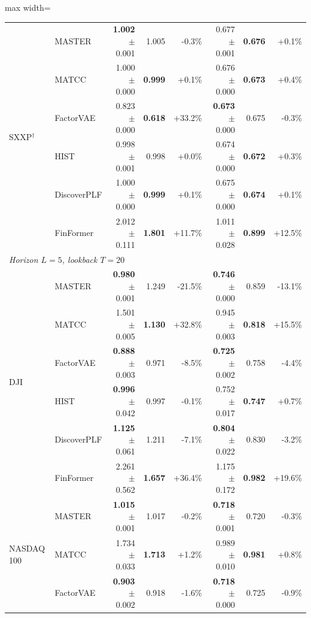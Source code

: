 \begin{table}[tb]
\begin{adjustbox}{max width=\textwidth}
{\begin{tabular}{llrrrrrr}
\midrule
\multirow{6}{*}{SXXP$^\dagger$} & MASTER & \textbf{1.002} {\scriptsize$\pm$0.001} & 1.005 & -0.3\% & 0.677 {\scriptsize$\pm$0.001} & \textbf{0.676} & +0.1\% \\
 & MATCC & 1.000 {\scriptsize$\pm$0.000} & \textbf{0.999} & +0.1\% & 0.676 {\scriptsize$\pm$0.000} & \textbf{0.673} & +0.4\% \\
 & FactorVAE & 0.823 {\scriptsize$\pm$0.000} & \textbf{0.618} & +33.2\% & \textbf{0.673} {\scriptsize$\pm$0.000} & 0.675 & -0.3\% \\
 & HIST & 0.998 {\scriptsize$\pm$0.001} & 0.998 & +0.0\% & 0.674 {\scriptsize$\pm$0.000} & \textbf{0.672} & +0.3\% \\
 & DiscoverPLF & 1.000 {\scriptsize$\pm$0.000} & \textbf{0.999} & +0.1\% & 0.675 {\scriptsize$\pm$0.000} & \textbf{0.674} & +0.1\% \\
 & FinFormer & 2.012 {\scriptsize$\pm$0.111} & \textbf{1.801} & +11.7\% & 1.011 {\scriptsize$\pm$0.028} & \textbf{0.899} & +12.5\% \\
\midrule
\multicolumn{8}{l}{\textit{Horizon $L=5$, lookback $T=20$}} \\
\multirow{6}{*}{DJI} & MASTER & \textbf{0.980} {\scriptsize$\pm$0.001} & 1.249 & -21.5\% & \textbf{0.746} {\scriptsize$\pm$0.000} & 0.859 & -13.1\% \\
 & MATCC & 1.501 {\scriptsize$\pm$0.005} & \textbf{1.130} & +32.8\% & 0.945 {\scriptsize$\pm$0.003} & \textbf{0.818} & +15.5\% \\
 & FactorVAE & \textbf{0.888} {\scriptsize$\pm$0.003} & 0.971 & -8.5\% & \textbf{0.725} {\scriptsize$\pm$0.002} & 0.758 & -4.4\% \\
 & HIST & \textbf{0.996} {\scriptsize$\pm$0.042} & 0.997 & -0.1\% & 0.752 {\scriptsize$\pm$0.017} & \textbf{0.747} & +0.7\% \\
 & DiscoverPLF & \textbf{1.125} {\scriptsize$\pm$0.061} & 1.211 & -7.1\% & \textbf{0.804} {\scriptsize$\pm$0.022} & 0.830 & -3.2\% \\
 & FinFormer & 2.261 {\scriptsize$\pm$0.562} & \textbf{1.657} & +36.4\% & 1.175 {\scriptsize$\pm$0.172} & \textbf{0.982} & +19.6\% \\
\midrule
\multirow{6}{*}{NASDAQ 100} & MASTER & \textbf{1.015} {\scriptsize$\pm$0.001} & 1.017 & -0.2\% & \textbf{0.718} {\scriptsize$\pm$0.001} & 0.720 & -0.3\% \\
 & MATCC & 1.734 {\scriptsize$\pm$0.033} & \textbf{1.713} & +1.2\% & 0.989 {\scriptsize$\pm$0.010} & \textbf{0.981} & +0.8\% \\
 & FactorVAE & \textbf{0.903} {\scriptsize$\pm$0.002} & 0.918 & -1.6\% & \textbf{0.718} {\scriptsize$\pm$0.000} & 0.725 & -0.9\% \\

\end{tabular}}
\end{adjustbox}
\end{table}
